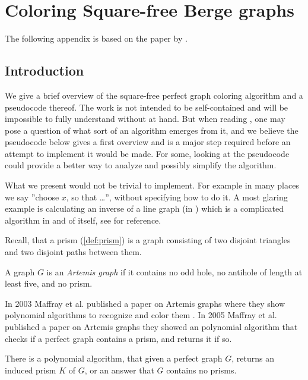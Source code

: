 \chapter{Coloring Square-free Berge graphs}
\label{ch:coloringSquareFree}

The following appendix is based on the paper  by \citeauthor{coloringSquareFree} \cite{coloringSquareFree}.

\section{Introduction}
We give a brief overview of the square-free perfect graph coloring algorithm and a pseudocode thereof. The work is not intended to be self-contained and will be impossible to fully understand without \cite{coloringSquareFree} at hand. But when reading \cite{coloringSquareFree}, one may pose a question of what sort of an algorithm emerges from it, and we believe the pseudocode below gives a first overview and is a major step required before an attempt to implement it would be made. For some, looking at the pseudocode could provide a better way to analyze and possibly simplify the algorithm.

What we present would not be trivial to implement. For example in many places we say ''choose $x$, so that \dots'', without specifying how to do it. A most glaring example is calculating an inverse of a line graph (in ) which is a complicated algorithm in and of itself, see \cite{Liu2014} for reference.

Recall, that a prism (\cref{def:prism}) is a graph consisting of two disjoint triangles and two disjoint paths between them.

\begin{defnTwo}
  A graph $G$ is an \emph{Artemis graph} if it contains no odd hole, no antihole of length at least five, and no prism.
\end{defnTwo}

In 2003 Maffray et al. published a paper on Artemis graphs where they show polynomial algorithms to recognize and color them \cite{Maffray2006}. In 2005 Maffray et al. published a paper on Artemis graphs\cite{Maffray2005} they showed an polynomial algorithm that checks if a perfect graph contains a prism, and returns it if so.

\begin{theorem}{\cite{Maffray2005}}
  \label{thm:getPrism}
  There is a polynomial algorithm, that given a perfect graph $G$, returns an induced prism $K$ of $G$, or an answer that $G$ contains no prisms.
\end{theorem}


